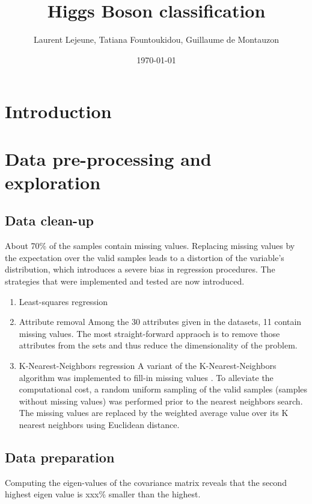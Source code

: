 \documentclass[10pt,conference,compsocconf]{IEEEtran}
\author{Laurent Lejeune, Tatiana Fountoukidou, Guillaume de Montauzon}
\date{\today}
\title{Higgs Boson classification}
\begin{document}
\maketitle
\section{Introduction}
\label{sec:orgheadline1}
\section{Data pre-processing and exploration}
\label{sec:orgheadline8}
\subsection{Data clean-up}
\label{sec:orgheadline5}
About 70\% of the samples contain missing values. Replacing missing values by the expectation over the valid samples leads to a distortion of the variable's distribution, which introduces a severe bias in regression procedures. The strategies that were implemented and tested are now introduced.

\begin{enumerate}
\item Least-squares regression
\label{sec:orgheadline2}

\item Attribute removal
\label{sec:orgheadline3}
Among the 30 attributes given in the datasets, 11 contain missing values. The most straight-forward appraoch is to remove those attributes from the sets and thus reduce the dimensionality of the problem.

\item K-Nearest-Neighbors regression
\label{sec:orgheadline4}
A variant of the K-Nearest-Neighbors algorithm was implemented to fill-in missing values \cite{malarvizhi12}. To alleviate the computational cost, a random uniform sampling of the valid samples (samples without missing values) was performed prior to the nearest neighbors search.
The missing values are replaced by the weighted average value over its K nearest neighbors using Euclidean distance.
\end{enumerate}

\subsection{Data preparation}
\label{sec:orgheadline6}
Computing the eigen-values of the covariance matrix reveals that the second highest eigen value is xxx\% smaller than the highest.
\end{document}
